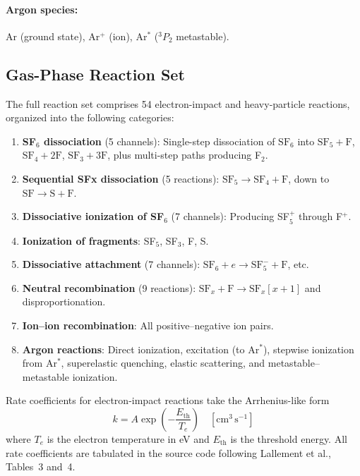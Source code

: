 \documentclass[11pt,a4paper]{article}
\newcommand{\SFx}{\mathrm{SF}_x}
\newcommand{\SFsix}{\mathrm{SF}_6}
\newcommand{\SFfive}{\mathrm{SF}_5}
\newcommand{\SFfour}{\mathrm{SF}_4}
\newcommand{\SFthree}{\mathrm{SF}_3}
\newcommand{\Te}{T_e}
\begin{document}
\paragraph{Argon species:} Ar (ground state), Ar$^+$ (ion), Ar$^*$ (${}^3P_2$ metastable).

\subsection{Gas-Phase Reaction Set}

The full reaction set comprises 54 electron-impact and heavy-particle reactions, organized into the following categories:

\begin{enumerate}[label=(\roman*)]
\item \textbf{SF$_6$ dissociation} (5 channels): Single-step dissociation of $\SFsix$ into $\SFfive + \mathrm{F}$, $\SFfour + 2\mathrm{F}$, $\SFthree + 3\mathrm{F}$, plus multi-step paths producing F$_2$.
\item \textbf{Sequential SFx dissociation} (5 reactions): $\SFfive \to \SFfour + \mathrm{F}$, down to $\mathrm{SF} \to \mathrm{S} + \mathrm{F}$.
\item \textbf{Dissociative ionization of SF$_6$} (7 channels): Producing SF$_5^+$ through F$^+$.
\item \textbf{Ionization of fragments}: SF$_5$, SF$_3$, F, S.
\item \textbf{Dissociative attachment} (7 channels): $\SFsix + e \to \SFfive^- + \mathrm{F}$, etc.
\item \textbf{Neutral recombination} (9 reactions): $\SFx + \mathrm{F} \to \SFx[x+1]$ and disproportionation.
\item \textbf{Ion--ion recombination}: All positive--negative ion pairs.
\item \textbf{Argon reactions}: Direct ionization, excitation (to Ar$^*$), stepwise ionization from Ar$^*$, superelastic quenching, elastic scattering, and metastable--metastable ionization.
\end{enumerate}

Rate coefficients for electron-impact reactions take the Arrhenius-like form
\begin{equation}
k = A \exp\!\left(-\frac{E_\mathrm{th}}{\Te}\right) \quad [\text{cm}^3\,\text{s}^{-1}]
\end{equation}
where $\Te$ is the electron temperature in eV and $E_\mathrm{th}$ is the threshold energy.  All rate coefficients are tabulated in the source code following Lallement et al., Tables~3 and~4.
\end{document}
